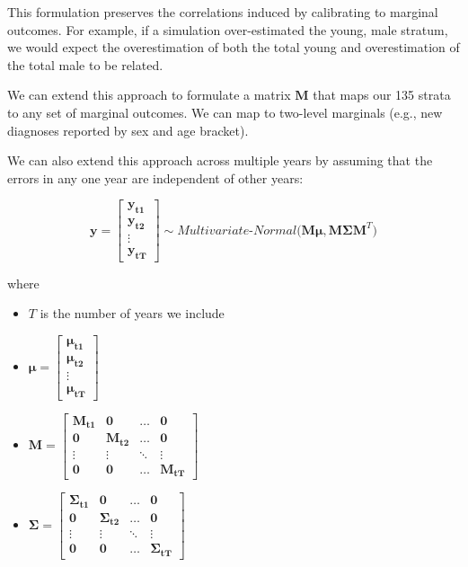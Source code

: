 \documentclass{article}
\begin{document}
This formulation preserves the correlations induced by calibrating to marginal outcomes. For example, if a simulation over-estimated the young, male stratum, we would expect the overestimation of both the total young and overestimation of the total male to be related.

We can extend this approach to formulate a matrix $\bm{M}$ that maps our 135 strata to any set of marginal outcomes. We can map to two-level marginals (e.g., new diagnoses reported by sex and age bracket).

We can also extend this approach across multiple years by assuming that the errors in any one year are independent of other years:

\begin{equation}
	\bm{y} = 
	\begin{bmatrix}
		\bm{y_{t1}} \\
		\bm{y_{t2}} \\
		\vdots \\
		\bm{y_{tT}}
	\end{bmatrix}
	\sim Multivariate\text{-}Normal\big(\bm{M} \bm{\mu}, \bm{M} \bm{\Sigma} \bm{M}^T\big) \label{eq_mapping}
\end{equation}

where
\begin{itemize}
	\item $T$ is the number of years we include
	\item $\bm{\mu} = \begin{bmatrix}
		\bm{\mu_{t1}} \\
		\bm{\mu_{t2}} \\
		\vdots \\
		\bm{\mu_{tT}}
		\end{bmatrix}$
	\item $\bm{M} = \begin{bmatrix}
		\bm{M_{t1}} & \bm{0} & \dots & \bm{0} \\
		\bm{0} & \bm{M_{t2}} & \dots & \bm{0} \\
		\vdots & \vdots & \ddots & \vdots \\
		\bm{0} & \bm{0} & \dots & \bm{M_{tT}}
		\end{bmatrix}$
	\item $\bm{\Sigma} = \begin{bmatrix}
		\bm{\Sigma_{t1}} & \bm{0} & \dots & \bm{0} \\
		\bm{0} & \bm{\Sigma_{t2}} & \dots & \bm{0} \\
		\vdots & \vdots & \ddots & \vdots \\
		\bm{0} & \bm{0} & \dots & \bm{\Sigma_{tT}}
		\end{bmatrix}$
\end{itemize}	
\end{document}
